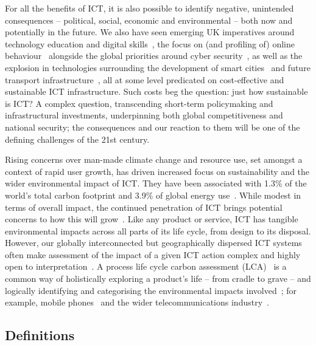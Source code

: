 \documentclass[conference]{IEEEtran}
\begin{document}
For all the benefits of ICT, it is also possible to identify negative,
unintended consequences -- political, social, economic and
environmental -- both now and potentially in the future. We also have
seen emerging UK imperatives around technology education and digital
skills~\cite{brown-et-al-toce2014}, the focus on (and profiling of)
online behaviour~\cite{oatley+crick:2014} alongside the global
priorities around cyber security~\cite{carr+crick-csss2015}, as well
as the explosion in technologies surrounding the development of smart
cities~\cite{cosgrave-et-al:2014} and future transport
infrastructure~\cite{cooper-et-al-sose}, all at some level predicated
on cost-effective and sustainable ICT infrastructure. Such costs beg
the question: just how sustainable is ICT? A complex question,
transcending short-term policymaking and infrastructural investments,
underpinning both global competitiveness and national security; the
consequences and our reaction to them will be one of the defining
challenges of the 21st century.

Rising concerns over man-made climate change and resource use, set
amongst a context of rapid user growth, has driven increased focus on
sustainability and the wider environmental impact of ICT. They have
been associated with 1.3\% of the world's total carbon footprint and
3.9\% of global energy use~\cite{plepys:2002}. While modest in terms
of overall impact, the continued penetration of ICT brings potential
concerns to how this will grow~\cite{yi+thomas:2007}. Like any product
or service, ICT has tangible environmental impacts across all parts of
its life cycle, from design to its disposal. However, our globally
interconnected but geographically dispersed ICT systems often make
assessment of the impact of a given ICT action complex and highly open
to interpretation~\cite{andrae+andersen:2010}. A process life cycle
carbon assessment
(LCA)~\cite{baumann+tillman:2004,iso14040:2006,bsi2050:2011} is a
common way of holistically exploring a product's life -- from cradle
to grave -- and logically identifying and categorising the
environmental impacts involved~\cite{malmodin-et-al:2014}; for
example, mobile phones~\cite{frey-et-al:2008,fehske:2011} and the
wider telecommunications industry~\cite{scharnhorst:2008}.

\subsection{Definitions}
\end{document}
